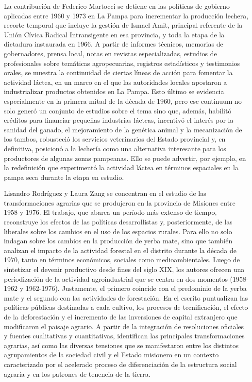 La contribución de Federico Martocci se detiene en las políticas de gobierno aplicadas entre 1960 y 1973 en La Pampa para incrementar la producción lechera, recorte temporal que incluye la gestión de Ismael Amit, principal referente de la Unión Cívica Radical Intransigente en esa provincia, y toda la etapa de la dictadura instaurada en 1966. A partir de informes técnicos, memorias de gobernadores, prensa local, notas en revistas especializadas, estudios de profesionales sobre temáticas agropecuarias, registros estadísticos y testimonios orales, se muestra la continuidad de ciertas líneas de acción para fomentar la actividad láctea, en un marco en el que las autoridades locales apostaron a industrializar productos obtenidos en La Pampa. Esto último se evidencia especialmente en la primera mitad de la década de 1960, pero ese continuum no solo generó un conjunto de estudios sobre el tema sino que, además, habilitó créditos para financiar pequeñas industrias lácteas, incentivó el interés por la sanidad del ganado, el mejoramiento de la genética animal y la mecanización de los tambos, robusteció los servicios veterinarios del Estado provincial y, en definitiva, posicionó a la lechería como una alternativa interesante para los productores de algunas zonas pampeanas. Ello se puede advertir, por ejemplo, en la redefinición que experimentó la actividad láctea en términos espaciales en la pampa seca durante la etapa en estudio.

Lisandro Rodríguez y Laura Zang se concentran en el estudio de las transformaciones agrarias que se produjeron en la provincia de Misiones entre 1958 y 1976. El trabajo, que abarca un período más extenso de tiempo, reconstruye los efectos de las políticas desarrollistas y, posteriormente, de las liberales sobre los cambios en el uso de los espacios rurales. Para ello no solo indagan sobre los cambios en la producción de yerba mate, sino que también analizan el impacto de la actividad forestal en el distrito durante la década de 1970, tanto en términos económicos, sociales como medioambientales. Luego de sintetizar el devenir productivo desde fines del siglo XIX, los autores ofrecen una periodización de la actividad agroindustrial que se centra en dos momentos (1958-1962 y 1962-1976). Justamente, el primero coincide con el predominio de la yerba mate y el segundo con las actividades de forestación. En el escrito puntualizan las políticas públicas destinadas a cada cultivo, los procesos de tecnificación, el efecto de la deforestación y el incremento de las inversiones de capital extranjero que modificaron el paisaje agrario. A partir de la integración de resoluciones oficiales y fuentes cualitativas y cuantitativas, identifican las principales transformaciones agrarias, así como las diversas tensiones que se manifestaron entre los distintos agrupamientos de la sociedad civil y el Estado misionero en un contexto caracterizado por el acelerado proceso de diferenciación de la estructura social agraria y en los patrones de tenencia de la tierra.


